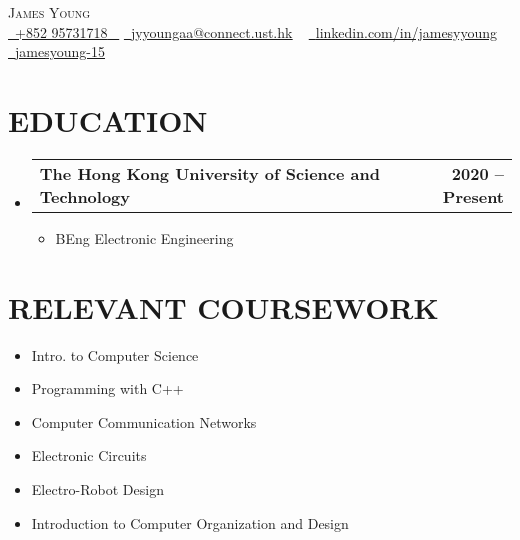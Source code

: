 \documentclass[letterpaper,11pt]{article}
\makeatletter
\newcommand{\resumeItem}[1]{
  \item\small{
    {#1 \vspace{-2pt}}
  }
}
\newcommand{\resumeSubheading}[4]{
  \vspace{-2pt}\item
    \begin{tabular*}{1.0\textwidth}[t]{l@{\extracolsep{\fill}}r}
      \textbf{\large#1} & \textbf{\small #2} \\
    \end{tabular*}\vspace{-7pt}
}
\newcommand{\resumeSubHeadingListStart}{\begin{itemize}[leftmargin=0.0in, label={}]}
\newcommand{\resumeSubHeadingListEnd}{\end{itemize}}
\newcommand{\resumeItemListStart}{\begin{itemize}}
\newcommand{\resumeItemListEnd}{\end{itemize}\vspace{-5pt}}
\makeatother
\begin{document}


\begin{center}
    {\Huge \scshape James Young} \\ \vspace{2pt}
    \small \href{tel:+85295731718}{ \raisebox{-0.1\height}\faPhone\ \underline{+852 95731718} ~} \href{mailto:jyyoungaa@connect.ust.hk}{\raisebox{-0.2\height}\faEnvelope\  \underline{jyyoungaa@connect.ust.hk}} ~ 
    \href{https://linkedin.com/in/JamesYYoung}{\raisebox{-0.2\height}\faLinkedinSquare\ \underline{linkedin.com/in/jamesyyoung}}  ~
    \href{https://github.com/jamesyoung-15}{\raisebox{-0.2\height}\faGithub\ \underline{jamesyoung-15}} ~
\end{center}

\section{EDUCATION}
  \resumeSubHeadingListStart
    \resumeSubheading
      {The Hong Kong University of Science and Technology}{2020 -- Present}
      {}{}
        \resumeItemListStart
            \resumeItem{\normalsize{BEng Electronic Engineering}}
        \resumeItemListEnd  
  \resumeSubHeadingListEnd

\section{RELEVANT COURSEWORK}
    \begin{multicols}{2}
        \begin{itemize}[itemsep=-2pt, parsep=5pt]
        \small
            \item Intro. to Computer Science
            \item Programming with C++
            \item Computer Communication Networks
            \item Electronic Circuits
            \item Electro-Robot Design
            \item Introduction to Computer Organization and Design
        \end{itemize}
    \end{multicols}
        \vspace*{2.0\multicolsep}
\vspace{5pt}
\end{document}
